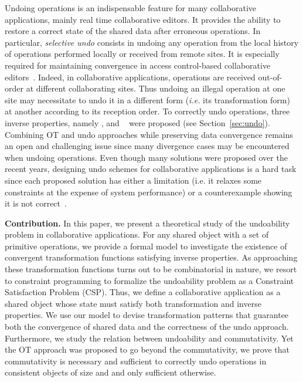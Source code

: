 \documentclass[submission,copyright,creativecommons]{eptcs}
\begin{document}
Undoing operations is an  indispensable feature for many collaborative applications, mainly real
time collaborative editors. It provides the ability to restore a correct state of the shared data after erroneous operations. In particular, \emph{selective undo} consists in undoing any operation from the local history of operations performed locally or received from  remote sites. It is especially required for  maintaining convergence in access control-based collaborative editors~\cite{CherifIR11,CherifIR14}. Indeed, in collaborative applications, operations are received out-of-order at different collaborating sites. Thus undoing an illegal operation at one site may necessitate to undo it in a different form (\textit{i.e.} its transformation form) at another according to its reception order. To correctly undo operations, three inverse properties,  namely ,  and ~\cite{Atul94,Sun02,SunS09,Ferrie04}  were proposed (see Section~\ref{sec:undo}). Combining OT and undo approaches while preserving data convergence
remains an open and challenging issue since many divergence cases may be encountered when undoing operations.
Even though many solutions were proposed over the recent years, designing undo schemes for collaborative applications is a hard task
since each proposed solution has either a limitation (i.e. it relaxes some constraints at the expense of system performance) or a counterexample showing it is not correct~\cite{SunS09, BinShao10}.

\medskip
\noindent\textbf{Contribution.}
In this paper, we present a theoretical study of the undoability problem in collaborative applications. For any shared object with a set of primitive operations, 
we provide a formal model to investigate the existence  of convergent transformation functions satisfying inverse properties. As approaching these transformation functions turns out to be combinatorial in nature, we resort to constraint programming  to formalize the  undoability problem as a Constraint Satisfaction Problem (CSP).
Thus, we define a collaborative application as a shared object whose state must satisfy both transformation and inverse properties. We use our model to devise transformation patterns that guarantee both the  convergence of shared data and the correctness of the undo approach. Furthermore, we study the relation between undoability and commutativity. Yet the OT approach was proposed to go beyond the commutativity, we prove that commutativity is necessary and sufficient to correctly undo operations in  consistent objects of size  and  and only sufficient otherwise.
\end{document}
